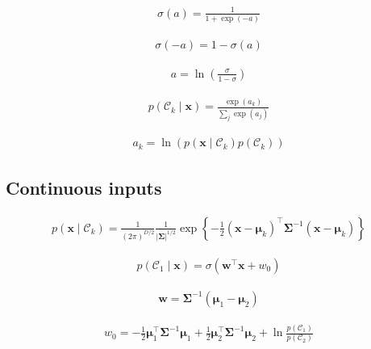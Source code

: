 \documentclass{article}
\begin{document}
\begin{align*}
\sigma(a) = \frac{1}{1 + \exp(-a)}
\tag{5.42}
\end{align*}

\begin{align*}
\sigma(-a) = 1 - \sigma(a)
\tag{5.43}
\end{align*}

\begin{align*}
a = \ln \left( \frac{\sigma}{1 - \sigma} \right)
\tag{5.44}
\end{align*}

\begin{align*}
p\left(\mathcal{C}_k \mid \mathbf{x}\right) = \frac{\exp \left(a_k\right)}{\sum_{j} \exp \left(a_j\right)}
\tag{5.45}
\end{align*}

\begin{align*}
a_k = \ln \left( p\left(\mathbf{x} \mid \mathcal{C}_k\right) p\left(\mathcal{C}_k\right) \right)
\tag{5.46}
\end{align*}

\subsection{Continuous inputs}

\begin{align*}
p\left(\mathbf{x} \mid \mathcal{C}_k\right) = \frac{1}{(2 \pi)^{D/2}} \frac{1}{|\boldsymbol{\Sigma}|^{1/2}} \exp \left\{ -\frac{1}{2} \left(\mathbf{x} - \boldsymbol{\mu}_k \right)^{\top} \boldsymbol{\Sigma}^{-1} \left(\mathbf{x} - \boldsymbol{\mu}_k \right) \right\}
\tag{5.47}
\end{align*}

\begin{align*}
p\left(\mathcal{C}_{1} \mid \mathbf{x}\right) = \sigma\left( \mathbf{w}^{\top} \mathbf{x} + w_0 \right)
\tag{5.48}
\end{align*}

\begin{align*}
\mathbf{w} = \boldsymbol{\Sigma}^{-1} \left( \boldsymbol{\mu}_1 - \boldsymbol{\mu}_2 \right)
\tag{5.49}
\end{align*}

\begin{align*}
w_0 = -\frac{1}{2} \boldsymbol{\mu}_1^{\top} \boldsymbol{\Sigma}^{-1} \boldsymbol{\mu}_1 + \frac{1}{2} \boldsymbol{\mu}_2^{\top} \boldsymbol{\Sigma}^{-1} \boldsymbol{\mu}_2 + \ln \frac{p\left(\mathcal{C}_{1}\right)}{p\left(\mathcal{C}_{2}\right)}
\tag{5.50}
\end{align*}
\end{document}
